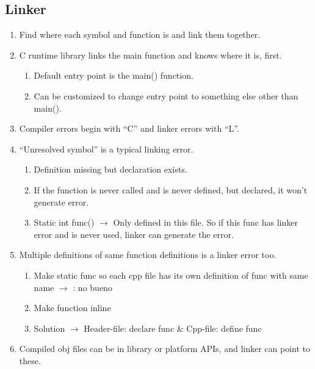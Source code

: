 \documentclass{article}
\begin{document}
    \subsection{Linker}
        \begin{enumerate}
            \item Find where each symbol and function is and link them together.
            \item C runtime library links the main function and knows where it is, first.
            \begin{enumerate}
                \item Default entry point is the main() function.
                \item Can be customized to change entry point to something else other than main().
            \end{enumerate}
            
            \item Compiler errors begin with “C” and linker errors with “L”.
            \item “Unresolved symbol” is a typical linking error.
            \begin{enumerate}
                \item Definition missing but declaration exists.
                \item If the function is never called and is never defined, but declared, it won’t generate error.
                \item Static int func() $\rightarrow$ Only defined in this file. So if this func has linker error and is never used, linker can generate the error. 
            \end{enumerate}
            
            \item Multiple definitions of same function definitions is a linker error too.
            \begin{enumerate}
                \item Make static func so each cpp file has its own definition of func with same name $\rightarrow$ : no bueno
                \item Make function inline
                \item Solution $\rightarrow$ Header-file: declare func \&  Cpp-file: define func
            \end{enumerate}
            \item Compiled obj files can be in library or platform APIs, and linker can point to these.
        \end{enumerate}
        
\end{document}
